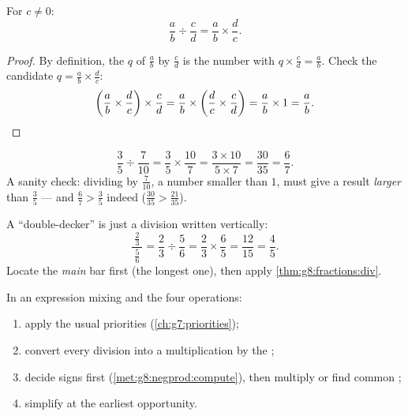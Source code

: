 \begin{theorem}\label{thm:g8:fractions:div}
For $c \neq 0$:
\[
\frac{a}{b} \div \frac{c}{d} = \frac{a}{b} \times \frac{d}{c} .
\]
\end{theorem}

\begin{proof}
By definition, the  $q$ of $\frac ab$ by $\frac cd$ is the
number with $q \times \frac cd = \frac ab$. Check the candidate
$q = \frac ab \times \frac dc$:
\[
\left(\frac ab \times \frac dc\right) \times \frac cd
= \frac ab \times \left(\frac dc \times \frac cd\right)
= \frac ab \times 1 = \frac ab . \qedhere
\]
\end{proof}

\begin{example}\label{ex:g8:fractions:div}
\[
\frac{3}{5} \div \frac{7}{10}
= \frac{3}{5} \times \frac{10}{7}
= \frac{3 \times 10}{5 \times 7}
= \frac{30}{35} = \frac{6}{7}.
\]
A sanity check: dividing by $\frac{7}{10}$, a number smaller than
$1$, must give a result \emph{larger} than $\frac35$ --- and
$\frac67 > \frac35$ indeed ($\frac{30}{35} > \frac{21}{35}$).
\end{example}

\begin{example}\label{ex:g8:fractions:complex}
A ``double-decker'' is just a division written vertically:
\[
\frac{\ \frac{2}{3}\ }{\ \frac{5}{6}\ }
= \frac{2}{3} \div \frac{5}{6}
= \frac{2}{3} \times \frac{6}{5}
= \frac{12}{15} = \frac{4}{5}.
\]
Locate the \emph{main} bar first (the longest one), then apply
\cref{thm:g8:fractions:div}.
\end{example}

\begin{method}\label{met:g8:fractions:mixed}
In an expression mixing  and the four operations:
\begin{enumerate}
  \item apply the usual priorities (\cref{ch:g7:priorities});
  \item convert every division into a multiplication by the ;
  \item decide signs first (\cref{met:g8:negprod:compute}), then
        multiply or find common ;
  \item simplify at the earliest opportunity.
\end{enumerate}
\end{method}

